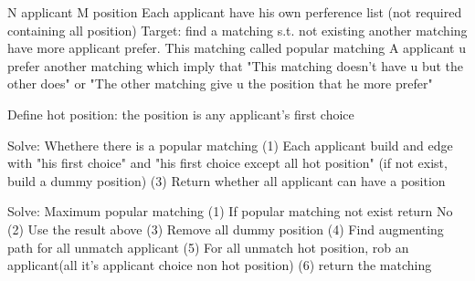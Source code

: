 N applicant M position
Each applicant have his own perference list (not required containing all position)
Target: find a matching s.t. not existing another matching have more applicant prefer. This matching called popular matching
A applicant u prefer another matching which imply that
    "This matching doesn't have u but the other does"
    or
    "The other matching give u the position that he more prefer"

Define hot position: the position is any applicant's first choice

Solve: Whethere there is a popular matching
(1) Each applicant build and edge with "his first choice" and "his first choice except all hot position" (if not exist, build a dummy position)
(3) Return whether all applicant can have a position

Solve: Maximum popular matching
(1) If popular matching not exist return No
(2) Use the result above
(3) Remove all dummy position
(4) Find augmenting path for all unmatch applicant
(5) For all unmatch hot position, rob an applicant(all it's applicant choice non hot position)
(6) return the matching
